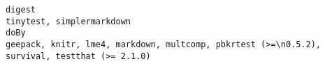 \documentclass[
  letterpaper,
  DIV=11,
  numbers=noendperiod]{scrreprt}
\begin{document}
\begin{verbatim}
digest                                                                                                                                                                                                                                                                                                                                                                                                                                                                                                                                                                                                                                                                                                                                                                                                                                                                                                                                                                                                                                                                                                                                                                                                                                                                              tinytest, simplermarkdown
doBy                                                                                                                                                                                                                                                                                                                                                                                                                                                                                                                                                                                                                                                                                                                                                                                                                                                                                                                                                                                                                                                                                                                                                                                                            geepack, knitr, lme4, markdown, multcomp, pbkrtest (>=\n0.5.2), survival, testthat (>= 2.1.0)

\end{verbatim}
\end{document}
